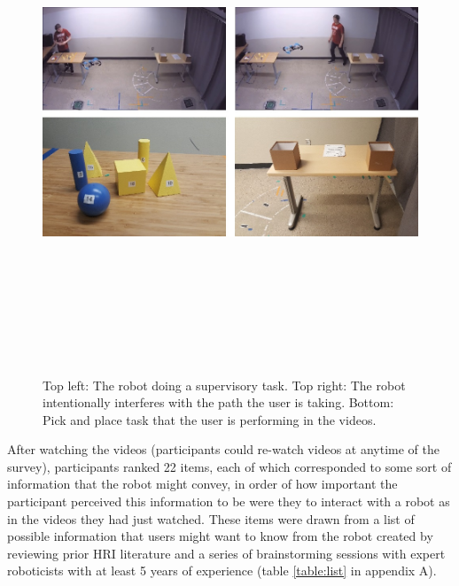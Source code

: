 \documentclass[letterpaper, 10 pt, conference]{ieeeconf}  %
\begin{document}
    \begin{figure}[h]
    \includegraphics[width=\textwidth,height=15cm]{task.jpg}
    \caption{Top left: The robot doing a supervisory task. Top right: The robot intentionally interferes with the path the user is taking. Bottom: Pick and place task that the user is performing in the videos.}
    \label{fig:task}
    \end{figure}
    
    After watching the videos (participants could re-watch videos at anytime of the survey), participants ranked 22 items, each of which corresponded to some sort of information that the robot might convey, in order of how important the participant perceived this information to be were they to interact with a robot as in the videos they had just watched. These items were drawn from a list of possible information that users might want to know from the robot created by reviewing prior HRI literature and a series of brainstorming sessions with expert roboticists with at least 5 years of experience (table \ref{table:list} in appendix A). 
    
\end{document}
